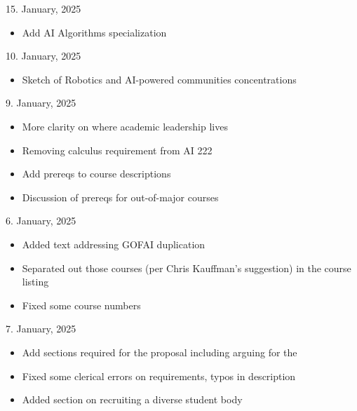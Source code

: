 15. January, 2025
\begin{itemize}
\item Add AI Algorithms specialization
\end{itemize}

10. January, 2025
\begin{itemize}
  \item Sketch of Robotics and AI-powered communities concentrations
\end{itemize}

9. January, 2025

\begin{itemize}
  \item More clarity on where academic leadership lives
  \item Removing calculus requirement from AI 222
  
  \item Add prereqs to course descriptions
  \item Discussion of prereqs for out-of-major courses
\end{itemize}

6. January, 2025

\begin{itemize}
    \item Added text addressing GOFAI duplication
    \item Separated out those courses (per Chris Kauffman's suggestion) in the course listing
    \item Fixed some course numbers
\end{itemize}

7. January, 2025

\begin{itemize}
    \item Add sections required for the  proposal including arguing for the 
    \item Fixed some clerical errors on requirements, typos in description
    \item Added section on recruiting a diverse student body
\end{itemize}


